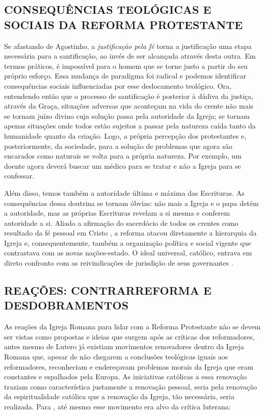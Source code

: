 \documentclass[
    article,            %
	12pt,				%
	oneside,			%
	a4paper,			%
	chapter=TITLE,		%
	section=TITLE,		%
	english,			%
	french,				%
	spanish,			%
	brazil				%
	]{abntex2}
\begin{document}
\subsection{CONSEQUÊNCIAS TEOLÓGICAS E SOCIAIS DA REFORMA PROTESTANTE}
Se afastando de Agostinho, a \emph{justificação pela fé} torna a justificação uma etapa necessária para a santificação, ao invés de ser alcançada através desta outra. Em termos práticos, é impossível para o homem que se torne justo a partir do seu próprio esforço. Essa mudança de paradigma foi radical e podemos identificar consequências sociais influenciadas por esse deslocamento teológico. Ora, entendendo então que o processo de santificação é posterior à dádiva da justiça, através da Graça, situações adversas que aconteçam na vida do crente não mais se tornam juízo divino cuja solução passa pela autoridade da Igreja; se tornam apenas situações onde todos estão sujeitos a passar pela natureza caída tanto da humanidade quanto da criação. Logo, a própria percepção dos protestantes e, posteriormente, da sociedade, para a solução de problemas que agora são encarados como naturais se volta para a própria natureza. Por exemplo, um doente agora deverá buscar um médico para se tratar e não a Igreja para se confessar.

Além disso, temos também a autoridade última e máxima das Escrituras. As consequências dessa doutrina se tornam óbvias: não mais a Igreja e o papa detém a autoridade, mas as próprias Escrituras revelam a si mesma e conferem autoridade a si. Aliado a afirmação do sacerdócio de todos os crentes como resultado da fé pessoal em Cristo \cite[p.263]{CAIRNS}, a reforma atacou diretamente a hierarquia da Igreja e, consequentemente, também a organização política e social vigente que contrastava com as novas nações-estado. O ideal universal, católico, entrava em direto confronto com as reivindicações de jurisdição de seus governantes \cite[p.252]{CAIRNS}.

\subsection{REAÇÕES: CONTRARREFORMA E DESDOBRAMENTOS}
As reações da Igreja Romana para lidar com a Reforma Protestante não se devem ser vistas como propostas e ideias que surgem após as críticas dos reformadores, antes mesmo de Lutero já existiam movimentos renovadores dentro da Igreja Romana que, apesar de não chegarem a conclusões teológicas iguais aos reformadores, reconheciam e endereçavam problemas morais da Igreja que eram constantes e espalhados pela Europa. As iniciativas católicas a essa renovação traziam como característica justamente a renovação pessoal, seria pela renovação da espiritualidade católica que a renovação da Igreja, tão necessária, seria realizada. Para , até mesmo esse movimento era alvo da crítica luterana:
\end{document}
